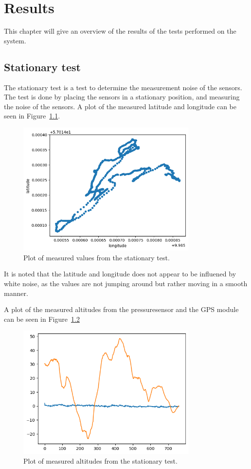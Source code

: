 \chapter{Results}\label{ch:results}
This chapter will give an overview of the results of the tests performed on the system.

\section{Stationary test}\label{sec:stationary-test}
The stationary test is a test to determine the measurement noise of the sensors.
The test is done by placing the sensors in a stationary position, and measuring the noise of the sensors.
A plot of the measured latitude and longitude can be seen in Figure~\ref{fig:stationary-test}.

\begin{figure}[H]
    \centering
    \includegraphics[width=0.8\textwidth]{chapters/05Results/figures/output}
    \caption{Plot of measured values from the stationary test.}
    \label{fig:stationary-test}
\end{figure}
It is noted that the latitude and longitude does not appear to be influened by white noise, as the values are not jumping around but rather moving in a smooth manner.

A plot of the measured altitudes from the pressuresensor and the GPS module can be seen in Figure~\ref{fig:altitude-test}

\begin{figure}
    \centering
    \includegraphics[width=0.8\textwidth]{chapters/05Results/figures/altitude}
    \caption{Plot of measured altitudes from the stationary test.}
    \label{fig:altitude-test}
\end{figure}

